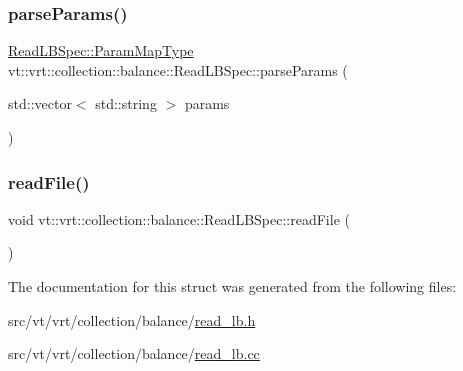 \mbox{\label{structvt_1_1vrt_1_1collection_1_1balance_1_1_read_l_b_spec_a69993cae4576e25d70929e95dad81d7e}} 
\subsubsection{\texorpdfstring{parse\+Params()}{parseParams()}}
{\footnotesize\ttfamily \hyperlink{structvt_1_1vrt_1_1collection_1_1balance_1_1_read_l_b_spec_a01c2aa3a9e92be646c37f24afda6afa2}{Read\+L\+B\+Spec\+::\+Param\+Map\+Type} vt\+::vrt\+::collection\+::balance\+::\+Read\+L\+B\+Spec\+::parse\+Params (\begin{DoxyParamCaption}\item[{std\+::vector$<$ std\+::string $>$}]{params }\end{DoxyParamCaption})\hspace{0.3cm}{\ttfamily [static]}}

\mbox{\label{structvt_1_1vrt_1_1collection_1_1balance_1_1_read_l_b_spec_a4a6d3bd1ef9a432a33518d42c92d9e9b}} 
\subsubsection{\texorpdfstring{read\+File()}{readFile()}}
{\footnotesize\ttfamily void vt\+::vrt\+::collection\+::balance\+::\+Read\+L\+B\+Spec\+::read\+File (\begin{DoxyParamCaption}{ }\end{DoxyParamCaption})\hspace{0.3cm}{\ttfamily [static]}}



The documentation for this struct was generated from the following files\+:\begin{DoxyCompactItemize}
\item 
src/vt/vrt/collection/balance/\hyperlink{read__lb_8h}{read\+\_\+lb.\+h}\item 
src/vt/vrt/collection/balance/\hyperlink{read__lb_8cc}{read\+\_\+lb.\+cc}\end{DoxyCompactItemize}
